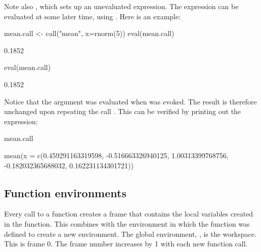 Note also , which sets up an unevaluated expression.
The expression can be evaluated at some later time, using .
Here is an example:
\begin{Schunk}
\begin{Sinput}
mean.call <- call("mean", x=rnorm(5))
eval(mean.call)
\end{Sinput}
\begin{Soutput}
[1] 0.1852
\end{Soutput}
\begin{Sinput}
eval(mean.call)
\end{Sinput}
\begin{Soutput}
[1] 0.1852
\end{Soutput}
\end{Schunk}
Notice that the argument  was evaluated when 
was evoked. The result is therefore unchanged upon repeating the
call . This can be verified by printing out the
expression:
\begin{fullwidth}

\begin{Schunk}
\begin{Sinput}
mean.call
\end{Sinput}
\begin{Soutput}
mean(x = c(0.459291163319598, -0.516663326940125, 1.00313399768756, 
-0.182032365688032, 0.162231134301721))
\end{Soutput}
\end{Schunk}

\end{fullwidth}

\subsection{Function environments}
Every call to a function creates a frame that contains the local
variables created in the function. This combines with the environment
in which the function was defined to create a new environment.
The global environment, , is the workspace.  This
is frame 0. The frame number increases by 1 with each new function
call.

